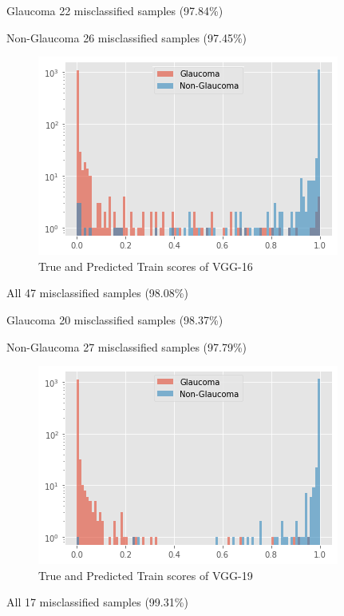 Glaucoma  22 misclassified samples (97.84\%)

Non-Glaucoma  26 misclassified samples (97.45\%)

\vspace{5mm}
\begin{figure}[hbt!]
\centering
\includegraphics[scale=0.75]{images/fig-38.png}
\caption{True and Predicted Train scores of VGG-16}
\label{fig:x True and Predicted Train scores of VGG-16}
\end{figure}

\newpage

All   47 misclassified samples (98.08\%)

Glaucoma  20 misclassified samples (98.37\%)

Non-Glaucoma  27 misclassified samples (97.79\%)

\vspace{5mm}
\begin{figure}[hbt!]
\centering
\includegraphics[scale=0.75]{images/fig-39.png}
\caption{True and Predicted Train scores of VGG-19}
\label{fig:x True and Predicted Train scores of VGG-19}
\end{figure}

All   17 misclassified samples (99.31\%)

